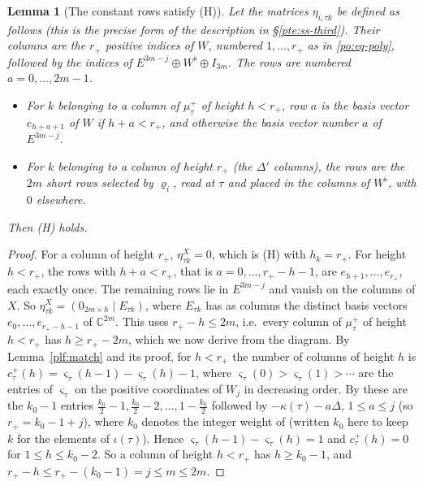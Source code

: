 \documentclass[10pt]{amsart}
\newtheorem{lemma}[theorem]{Lemma}
\theoremstyle{definition}
\theoremstyle{remark}
\newcommand{\C}{\mathbb C}
\begin{document}
\begin{lemma}[The constant rows satisfy (H)]\label{ptf:H}
Let the matrices $\eta_{i,\tau k}$ be defined as follows (this is the precise form of the description in
\S\ref{pte:ss-third}). Their columns are the $r_+$ positive indices of $W$, numbered $1,\dots,r_+$ as in
\eqref{po:eq-poly}, followed by the indices of $E^{3m-j}\oplus W^\flat\oplus I_{3m}$. The rows are numbered
$a=0,\dots,2m-1$.
\begin{itemize}
\item For $k$ belonging to a column of $\mu^+_\tau$ of height $h<r_+$, row $a$ is the basis vector $e_{h+a+1}$ of
$W$ if $h+a<r_+$, and otherwise the basis vector number $a$ of $E^{3m-j}$.
\item For $k$ belonging to a column of height $r_+$ (the $\Delta'$ columns), the rows are the $2m$ short rows
selected by $\varrho_i$, read at $\tau$ and placed in the columns of $W^\flat$, with $0$ elsewhere.
\end{itemize}
Then (H) holds.
\end{lemma}
\begin{proof}
For a column of height $r_+$, $\eta^X_{\tau k}=0$, which is (H) with $h_k=r_+$. For height $h<r_+$, the rows with
$h+a<r_+$, that is $a=0,\dots,r_+-h-1$, are $e_{h+1},\dots,e_{r_+}$, each exactly once. The remaining rows lie in
$E^{3m-j}$ and vanish on the columns of $X$. So $\eta^X_{\tau k}=(0_{2m\times h}\mid E_{\tau k})$, where $E_{\tau k}$
has as columns the distinct basis vectors $e_0,\dots,e_{r_+-h-1}$ of $\C^{2m}$. This uses $r_+-h\le2m$, i.e.\ every column of $\mu^+_\tau$ of height $h<r_+$ has $h\ge r_+-2m$, which we now
derive from the diagram. By Lemma~\ref{plf:match} and its proof, for $h<r_+$ the number of columns of height $h$ is
$c^+_\tau(h)=\varsigma_\tau(h-1)-\varsigma_\tau(h)-1$, where $\varsigma_\tau(0)>\varsigma_\tau(1)>\cdots$ are the entries of
$\varsigma_\tau$ on the positive coordinates of $W_j$ in decreasing order. By {\cite[\S14.3]{P46}} these are the
$k_0-1$ entries $\frac{k_0}2-1,\frac{k_0}2-2,\dots,1-\frac{k_0}2$ followed by $-\kappa(\tau)-a\Delta$, $1\le a\le j$ (so $r_+=k_0-1+j$), where $k_0$ denotes the integer weight of {\cite[\S14.3]{P46}} (written $k_0$ here to keep $k$ for the elements of $\iota(\tau)$).
Hence $\varsigma_\tau(h-1)-\varsigma_\tau(h)=1$ and $c^+_\tau(h)=0$ for $1\le h\le k_0-2$. So a column of height $h<r_+$ has
$h\ge k_0-1$, and $r_+-h\le r_+-(k_0-1)=j\le m\le2m$.
\end{proof}
\end{document}
